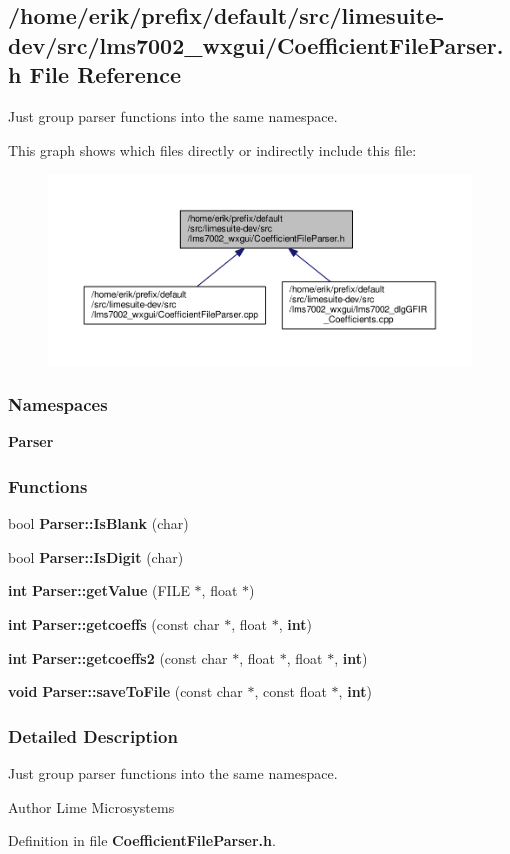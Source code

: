 \subsection{/home/erik/prefix/default/src/limesuite-\/dev/src/lms7002\+\_\+wxgui/\+Coefficient\+File\+Parser.h File Reference}
\label{CoefficientFileParser_8h}


Just group parser functions into the same namespace.  


This graph shows which files directly or indirectly include this file\+:
\nopagebreak
\begin{figure}[H]
\begin{center}
\leavevmode
\includegraphics[width=350pt]{d9/d87/CoefficientFileParser_8h__dep__incl}
\end{center}
\end{figure}
\subsubsection*{Namespaces}
\begin{DoxyCompactItemize}
\item 
 {\bf Parser}
\end{DoxyCompactItemize}
\subsubsection*{Functions}
\begin{DoxyCompactItemize}
\item 
bool {\bf Parser\+::\+Is\+Blank} (char)
\item 
bool {\bf Parser\+::\+Is\+Digit} (char)
\item 
{\bf int} {\bf Parser\+::get\+Value} (F\+I\+LE $\ast$, float $\ast$)
\item 
{\bf int} {\bf Parser\+::getcoeffs} (const char $\ast$, float $\ast$, {\bf int})
\item 
{\bf int} {\bf Parser\+::getcoeffs2} (const char $\ast$, float $\ast$, float $\ast$, {\bf int})
\item 
{\bf void} {\bf Parser\+::save\+To\+File} (const char $\ast$, const float $\ast$, {\bf int})
\end{DoxyCompactItemize}


\subsubsection{Detailed Description}
Just group parser functions into the same namespace. 

\begin{DoxyAuthor}{Author}
Lime Microsystems 
\end{DoxyAuthor}


Definition in file {\bf Coefficient\+File\+Parser.\+h}.

